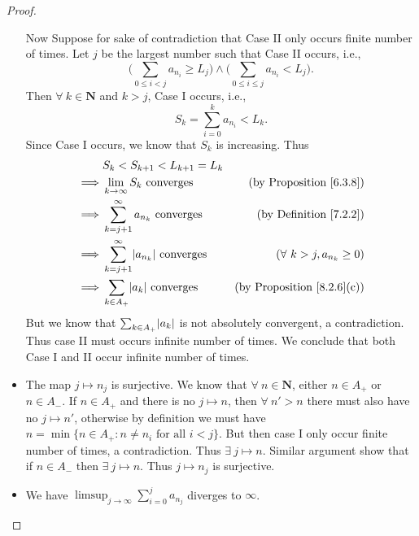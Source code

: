 \begin{proof}
\begin{itemize}
              Now Suppose for sake of contradiction that Case II only occurs finite number of times.
              Let \(j\) be the largest number such that Case II occurs, i.e.,
              \[
                  \Bigg(\sum_{0 \leq i < j} a_{n_i} \geq L_j\Bigg) \land \Bigg(\sum_{0 \leq i \leq j} a_{n_i} < L_j\Bigg).
              \]
              Then \(\forall\ k \in \mathbf{N}\) and \(k > j\), Case I occurs, i.e.,
              \[
                  S_k = \sum_{i = 0}^k a_{n_i} < L_k.
              \]
              Since Case I occurs, we know that \(S_k\) is increasing.
              Thus
              \begin{align*}
                           & S_k < S_{k + 1} < L_{k + 1} = L_k                                                                 \\
                  \implies & \lim_{k \to \infty} S_k \text{ converges}                & \text{(by Proposition \ref{6.3.8})}    \\
                  \implies & \sum_{k = j + 1}^\infty a_{n_k} \text{ converges}        & \text{(by Definition \ref{7.2.2})}     \\
                  \implies & \sum_{k = j + 1}^\infty \abs*{a_{n_k}} \text{ converges} & (\forall\ k > j, a_{n_k} \geq 0)       \\
                  \implies & \sum_{k \in A_+} \abs*{a_k} \text{ converges}            & \text{(by Proposition \ref{8.2.6}(c))}
              \end{align*}
              But we know that \(\sum_{k \in A_+} \abs*{a_k}\) is not absolutely convergent, a contradiction.
              Thus case II must occurs infinite number of times.
              We conclude that both Case I and II occur infinite number of times.
        \item The map \(j \mapsto n_j\) is surjective.
              We know that \(\forall\ n \in \mathbf{N}\), either \(n \in A_+\) or \(n \in A_-\).
              If \(n \in A_+\) and there is no \(j \mapsto n\), then \(\forall\ n' > n\) there must also have no \(j \mapsto n'\), otherwise by definition we must have \(n = \min\{n \in A_+ : n \neq n_i \text{ for all } i < j\}\).
              But then case I only occur finite number of times, a contradiction.
              Thus \(\exists\ j \mapsto n\).
              Similar argument show that if \(n \in A_-\) then \(\exists\ j \mapsto n\).
              Thus \(j \mapsto n_j\) is surjective.
        \item We have \(\limsup_{j \to \infty} \sum_{i = 0}^j a_{n_j}\) diverges to \(\infty\).

\end{itemize}
\end{proof}
